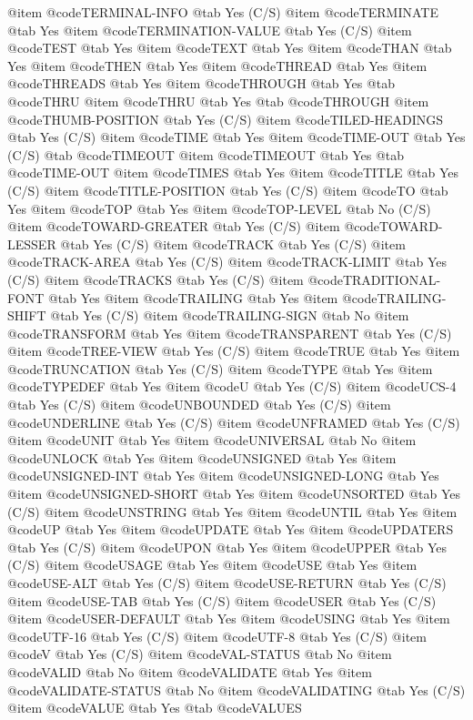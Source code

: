 @item @code{TERMINAL-INFO} @tab Yes (C/S)
@item @code{TERMINATE} @tab Yes
@item @code{TERMINATION-VALUE} @tab Yes (C/S)
@item @code{TEST} @tab Yes
@item @code{TEXT} @tab Yes
@item @code{THAN} @tab Yes
@item @code{THEN} @tab Yes
@item @code{THREAD} @tab Yes
@item @code{THREADS} @tab Yes
@item @code{THROUGH} @tab Yes @tab @code{THRU}
@item @code{THRU} @tab Yes @tab @code{THROUGH}
@item @code{THUMB-POSITION} @tab Yes (C/S)
@item @code{TILED-HEADINGS} @tab Yes (C/S)
@item @code{TIME} @tab Yes
@item @code{TIME-OUT} @tab Yes (C/S) @tab @code{TIMEOUT}
@item @code{TIMEOUT} @tab Yes @tab @code{TIME-OUT}
@item @code{TIMES} @tab Yes
@item @code{TITLE} @tab Yes (C/S)
@item @code{TITLE-POSITION} @tab Yes (C/S)
@item @code{TO} @tab Yes
@item @code{TOP} @tab Yes
@item @code{TOP-LEVEL} @tab No (C/S)
@item @code{TOWARD-GREATER} @tab Yes (C/S)
@item @code{TOWARD-LESSER} @tab Yes (C/S)
@item @code{TRACK} @tab Yes (C/S)
@item @code{TRACK-AREA} @tab Yes (C/S)
@item @code{TRACK-LIMIT} @tab Yes (C/S)
@item @code{TRACKS} @tab Yes (C/S)
@item @code{TRADITIONAL-FONT} @tab Yes
@item @code{TRAILING} @tab Yes
@item @code{TRAILING-SHIFT} @tab Yes (C/S)
@item @code{TRAILING-SIGN} @tab No
@item @code{TRANSFORM} @tab Yes
@item @code{TRANSPARENT} @tab Yes (C/S)
@item @code{TREE-VIEW} @tab Yes (C/S)
@item @code{TRUE} @tab Yes
@item @code{TRUNCATION} @tab Yes (C/S)
@item @code{TYPE} @tab Yes
@item @code{TYPEDEF} @tab Yes
@item @code{U} @tab Yes (C/S)
@item @code{UCS-4} @tab Yes (C/S)
@item @code{UNBOUNDED} @tab Yes (C/S)
@item @code{UNDERLINE} @tab Yes (C/S)
@item @code{UNFRAMED} @tab Yes (C/S)
@item @code{UNIT} @tab Yes
@item @code{UNIVERSAL} @tab No
@item @code{UNLOCK} @tab Yes
@item @code{UNSIGNED} @tab Yes
@item @code{UNSIGNED-INT} @tab Yes
@item @code{UNSIGNED-LONG} @tab Yes
@item @code{UNSIGNED-SHORT} @tab Yes
@item @code{UNSORTED} @tab Yes (C/S)
@item @code{UNSTRING} @tab Yes
@item @code{UNTIL} @tab Yes
@item @code{UP} @tab Yes
@item @code{UPDATE} @tab Yes
@item @code{UPDATERS} @tab Yes (C/S)
@item @code{UPON} @tab Yes
@item @code{UPPER} @tab Yes (C/S)
@item @code{USAGE} @tab Yes
@item @code{USE} @tab Yes
@item @code{USE-ALT} @tab Yes (C/S)
@item @code{USE-RETURN} @tab Yes (C/S)
@item @code{USE-TAB} @tab Yes (C/S)
@item @code{USER} @tab Yes (C/S)
@item @code{USER-DEFAULT} @tab Yes
@item @code{USING} @tab Yes
@item @code{UTF-16} @tab Yes (C/S)
@item @code{UTF-8} @tab Yes (C/S)
@item @code{V} @tab Yes (C/S)
@item @code{VAL-STATUS} @tab No
@item @code{VALID} @tab No
@item @code{VALIDATE} @tab Yes
@item @code{VALIDATE-STATUS} @tab No
@item @code{VALIDATING} @tab Yes (C/S)
@item @code{VALUE} @tab Yes @tab @code{VALUES}
